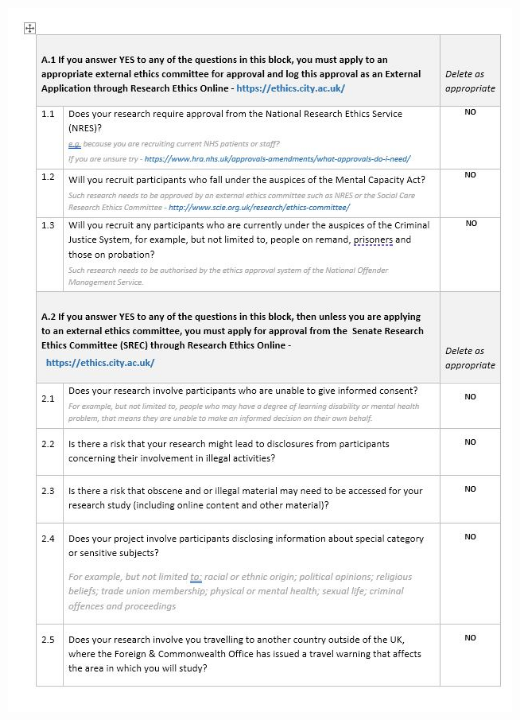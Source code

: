 \documentclass[12pt]{report}
\begin{document}
\includegraphics[width=160mm]{./images/appendix/PDD6.JPG}
\end{document}
